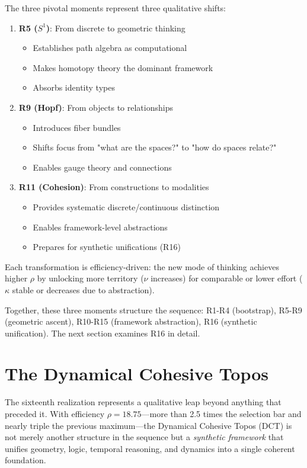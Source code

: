 \documentclass[11pt]{article}
\theoremstyle{definition}
\begin{document}
The three pivotal moments represent three qualitative shifts:

\begin{enumerate}
\item \textbf{R5 ($S^1$)}: From discrete to geometric thinking
\begin{itemize}
\item Establishes path algebra as computational
\item Makes homotopy theory the dominant framework
\item Absorbs identity types
\end{itemize}

\item \textbf{R9 (Hopf)}: From objects to relationships
\begin{itemize}
\item Introduces fiber bundles
\item Shifts focus from "what are the spaces?" to "how do spaces relate?"
\item Enables gauge theory and connections
\end{itemize}

\item \textbf{R11 (Cohesion)}: From constructions to modalities
\begin{itemize}
\item Provides systematic discrete/continuous distinction
\item Enables framework-level abstractions
\item Prepares for synthetic unifications (R16)
\end{itemize}
\end{enumerate}

Each transformation is efficiency-driven: the new mode of thinking achieves higher $\rho$ by unlocking more territory ($\nu$ increases) for comparable or lower effort ($\kappa$ stable or decreases due to abstraction).

Together, these three moments structure the sequence: R1-R4 (bootstrap), R5-R9 (geometric ascent), R10-R15 (framework abstraction), R16 (synthetic unification). The next section examines R16 in detail.

\section{The Dynamical Cohesive Topos}
\label{sec:dct}

The sixteenth realization represents a qualitative leap beyond anything that preceded it. With efficiency $\rho=18.75$—more than 2.5 times the selection bar and nearly triple the previous maximum—the Dynamical Cohesive Topos (DCT) is not merely another structure in the sequence but a \emph{synthetic framework} that unifies geometry, logic, temporal reasoning, and dynamics into a single coherent foundation.
\end{document}
